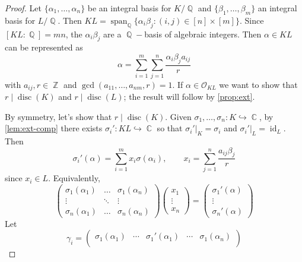 \documentclass[11pt, a4paper]{memoir}
\DeclareMathOperator{\Q}{{\mathbb{Q}}}
\DeclareMathOperator{\Z}{{\mathbb{Z}}}
\DeclareMathOperator{\C}{{\mathbb{C}}}
\newcommand{\hto}[0]{\ensuremath{\hookrightarrow}}
\theoremstyle{change}
\theoremstyle{plain}
\theoremstyle{nonumberplain}
\newtheorem{proof}{Proof}
\DeclareMathOperator{\disc}{disc}
\DeclareMathOperator{\id}{id}
\DeclareMathOperator{\spn}{span}
\begin{document}
\begin{proof}
    Let $\{\alpha_1,\ldots,\alpha_n\}$ be an integral basis for $K/\Q$ and $\{\beta_1,\ldots,\beta_m\}$ an integral basis for $L/\Q$.
    Then $KL=\spn_{\Q}\{\alpha_i\beta_j:(i,j)\in[n]\times[m]\}$.
    Since $[KL:\Q]=mn$, the $\alpha_i\beta_j$ are a $\Q-$basis of algebraic integers.
    Then $\alpha\in KL$ can be represented as
    \begin{equation*}
        \alpha=\sum\limits_{i=1}^m\sum\limits_{j=1}^n\frac{\alpha_i\beta_ja_{ij}}{r}
    \end{equation*}
    with $a_{ij},r\in\Z$ and $\gcd(a_{11},\ldots,a_{nm},r)=1$.
    If $\alpha\in\mathcal{O}_{KL}$ we want to show that $r\mid\disc(K)$ and $r\mid\disc(L)$; the result will follow by \cref{prop:ext}.
    
    By symmetry, let's show that $r\mid\disc(K)$.
    Given $\sigma_1,\ldots,\sigma_n:K\hto\C$, by \cref{lem:ext-comp} there exists $\sigma_i':KL\hto\C$ so that $\sigma_i'|_K=\sigma_i$ and $\sigma_i'|_L=\id_L$.
    Then
    \begin{equation*}
        \sigma_i'(\alpha) = \sum\limits_{i=1}^m x_i\sigma(\alpha_i),\qquad x_i=\sum\limits_{j=1}^n\frac{a_{ij}\beta_j}{r}
    \end{equation*}
    since $x_i\in L$.
    Equivalently,
    \begin{equation*}
        \begin{pmatrix}
            \sigma_1(\alpha_1)&\hdots&\sigma_1(\alpha_n)\\
            \vdots&\ddots&\vdots\\
            \sigma_n(\alpha_1)&\hdots&\sigma_n(\alpha_n)
        \end{pmatrix}
        \begin{pmatrix}
            x_1\\\vdots\\x_n
        \end{pmatrix}
        =
        \begin{pmatrix}
            \sigma_1'(\alpha)\\\vdots\\\sigma_n'(\alpha)
        \end{pmatrix}
    \end{equation*}
    Let
    \begin{equation*}
        \gamma_i=
        \begin{pmatrix}
            \sigma_1(\alpha_1)&\cdots&\sigma_1'(\alpha_1)&\cdots&\sigma_1(\alpha_n)\\

\end{pmatrix}
\end{equation*}
\end{proof}
\end{document}
